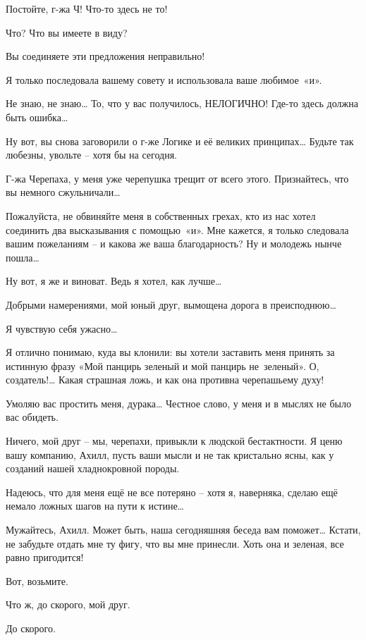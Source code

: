 \documentclass[../main.tex]{subfiles}
\begin{document}
\begin{Dialogue}

 Постойте, г-жа Ч! Что-то здесь не то!

 Что? Что вы имеете в виду?

 Вы соединяете эти предложения неправильно!

 Я только последовала вашему совету и использовала ваше любимое~«и».

 Не знаю, не знаю\ldots{} То, что у вас получилось, НЕЛОГИЧНО! Где-то здесь должна быть ошибка\ldots{}

 Ну вот, вы снова заговорили о г-же Логике и её великих принципах\ldots{} Будьте так любезны, увольте \--- хотя бы на сегодня.

 Г-жа Черепаха, у меня уже черепушка трещит от всего этого. Признайтесь, что вы немного сжульничали\ldots{}

 Пожалуйста, не обвиняйте меня в собственных грехах, кто из нас хотел соединить два высказывания с помощью~«и». Мне кажется, я только следовала вашим пожеланиям \--- и какова же ваша благодарность? Ну и молодежь нынче пошла\ldots{}

 Ну вот, я же и виноват. Ведь я хотел, как лучше\ldots{}

 Добрыми намерениями, мой юный друг, вымощена дорога в преисподнюю\ldots{}

 Я чувствую себя ужасно\ldots{}

 Я отлично понимаю, куда вы клонили: вы хотели заставить меня принять за истинную фразу «Мой панцирь зеленый и мой панцирь не~зеленый». О, создатель!\ldots{} Какая страшная ложь, и как она противна черепашьему духу!

 Умоляю вас простить меня, дурака\ldots{} Честное слово, у меня и в мыслях не было вас обидеть.

 Ничего, мой друг \--- мы, черепахи, привыкли к людской бестактности. Я ценю вашу компанию, Ахилл, пусть ваши мысли и не так кристально ясны, как у созданий нашей хладнокровной породы.

 Надеюсь, что для меня ещё не все потеряно \--- хотя я, наверняка, сделаю ещё немало ложных шагов на пути к истине\ldots{}

 Мужайтесь, Ахилл. Может быть, наша сегодняшняя беседа вам поможет\ldots{} Кстати, не забудьте отдать мне ту фигу, что вы мне принесли. Хоть она и зеленая, все равно пригодится!

 Вот, возьмите.

 Что ж, до скорого, мой друг.

 До скорого.

\end{Dialogue}
\end{document}
